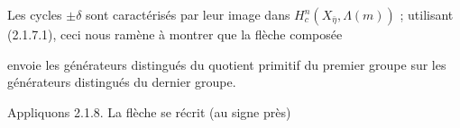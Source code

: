 Les cycles  $\pm \delta$  sont caractérisés par leur image dans  $H^{n}_{c}(X_{\bar{\eta}},\Lambda(m))$ ; utilisant (2.1.7.1), ceci nous ramène à montrer que la flèche composée

\begin{center}
\end{center}
envoie les générateurs distingués du quotient primitif du premier groupe sur les générateurs distingués du dernier groupe.

Appliquons 2.1.8. La flèche se récrit (au signe près)

